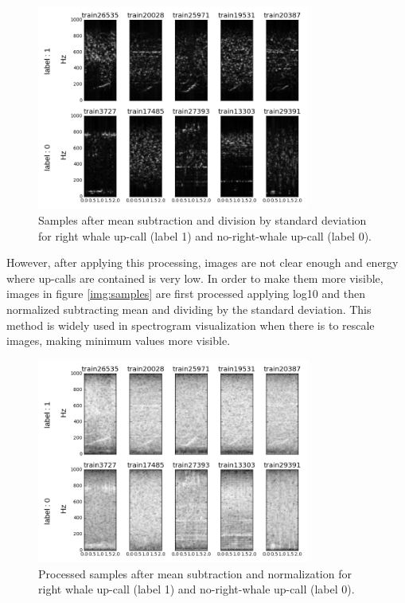 \documentclass[]{article}
\begin{document}
\begin{figure}[htpb!]
\centering
\includegraphics[width= 0.8\textwidth]{./images/2_samples_unprocessed}
\caption{ Samples after mean subtraction and division by standard deviation for right whale up-call (label 1) and no-right-whale up-call (label 0).  \label{img:samples_unprocessed}}
\end{figure} 

However, after applying this processing, images are not clear enough and energy where up-calls are contained is very low. In order to make them more visible, images in figure \ref{img:samples} are first processed applying log10 and then normalized subtracting mean and dividing by the standard deviation. This method is widely used in spectrogram visualization when there is to rescale images, making minimum values more visible.

\begin{figure}[htpb!]
\centering
\includegraphics[width= 0.8\textwidth]{./images/2_samples_processed}
\caption{Processed samples after mean subtraction and normalization for right whale up-call (label 1) and no-right-whale up-call (label 0).  \label{img:samples_processed}}
\end{figure} 
\end{document}
